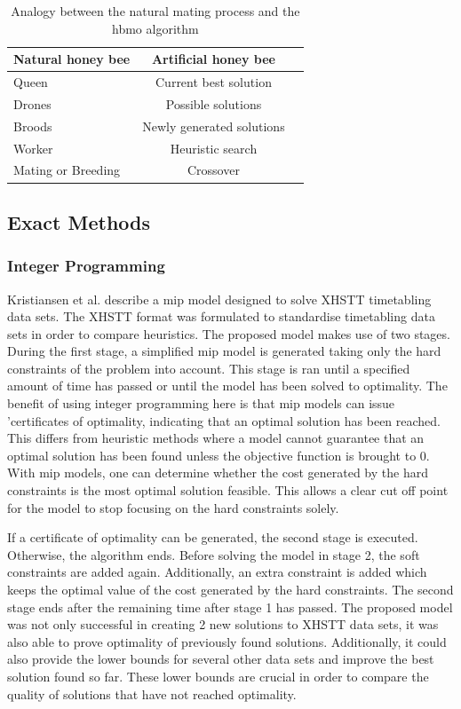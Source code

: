 \begin{table}[H]
	\caption{Analogy between the natural mating process and the \acrshort{hbmo} algorithm}
	\label{tab:hbmo}
	\centering
	\begin{tabular}{l c c }
		\hline
		\textbf{Natural honey bee}  & \textbf{Artificial honey bee} \\ \hline
		Queen & Current best solution \\
		Drones & Possible solutions \\
	    Broods & Newly generated solutions \\
            Worker & Heuristic search \\
            Mating or Breeding & Crossover \\ \hline
	\end{tabular}
\end{table}


\subsection{Exact Methods}
\subsubsection{Integer Programming}

Kristiansen et al. \cite{kristiansen2015} describe a \acrfull{mip} model designed to solve XHSTT timetabling data sets. The XHSTT format was formulated to standardise timetabling data sets in order to compare heuristics. The proposed model makes use of two stages. During the first stage, a simplified \acrshort{mip} model is generated taking only the hard constraints of the problem into account. This stage is ran until a specified amount of time has passed or until the model has been solved to optimality. The benefit of using integer programming here is that \acrshort{mip} models can issue 'certificates of optimality, indicating that an optimal solution has been reached. This differs from heuristic methods where a model cannot guarantee that an optimal solution has been found unless the objective function is brought to 0. With \acrshort{mip} models, one can determine whether the cost generated by the hard constraints is the most optimal solution feasible. This allows a clear cut off point for the model to stop focusing on the hard constraints solely. 

If a certificate of optimality can be generated, the second stage is executed. Otherwise, the algorithm ends. Before solving the model in stage 2, the soft constraints are added again. Additionally, an extra constraint is added which keeps the optimal value of the cost generated by the hard constraints. The second stage ends after the remaining time after stage 1 has passed. The proposed model was not only successful in creating 2 new solutions to XHSTT data sets, it was also able to prove optimality of previously found solutions. Additionally, it could also provide the lower bounds for several other data sets and improve the best solution found so far. These lower bounds are crucial in order to compare the quality of solutions that have not reached optimality.

